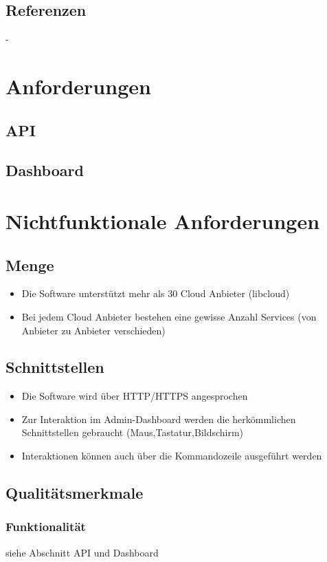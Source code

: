 \documentclass[11pt]{scrartcl}
\begin{document}
\subsection{Referenzen}
-

\section{Anforderungen}
\subsection{API}


\subsection{Dashboard}


\section{Nichtfunktionale Anforderungen}
\subsection{Menge}
\begin{itemize}
  \item Die Software unterstützt mehr als 30 Cloud Anbieter (libcloud)
  \item Bei jedem Cloud Anbieter bestehen eine gewisse Anzahl Services (von Anbieter zu Anbieter verschieden)
\end{itemize}

\subsection{Schnittstellen}
\begin{itemize}
  \item Die Software wird über HTTP/HTTPS angesprochen
  \item Zur Interaktion im Admin-Dashboard werden die herkömmlichen 
  Schnittstellen gebraucht (Maus,Tastatur,Bildschirm)
  \item Interaktionen können auch über die Kommandozeile ausgeführt werden
\end{itemize}
\subsection{Qualitätsmerkmale}
\subsubsection{Funktionalität}
siehe Abschnitt API und Dashboard
\end{document}
